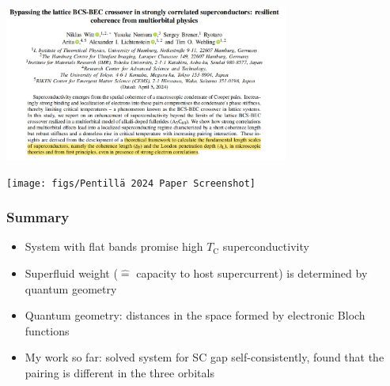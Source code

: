 \documentclass[aspectratio=169]{beamer}
\begin{document}
\begin{frame}
	\begin{center}
		\includegraphics[width=0.7\textwidth]{figs/Witt 2024 Paper Screenshot}
	\end{center}
\end{frame}

\begin{frame}
	
	\begin{center}
		\texttt{[image: figs/Pentillä 2024 Paper Screenshot]}
	\end{center}
\end{frame}


\begin{frame}
	\frametitle{Summary}
	
	\begin{itemize}
		\item System with flat bands promise high \(T_{\mathrm{C}}\) superconductivity\pause
		\item Superfluid weight (\(\hat{=}\) capacity to host supercurrent) is determined by quantum geometry\pause
		\item Quantum geometry: distances in the space formed by electronic Bloch functions\pause
		\item My work so far: solved system for SC gap self-consistently, found that the pairing is different in the three orbitals
	\end{itemize}	
\end{frame}

	
	
	
\end{document}
